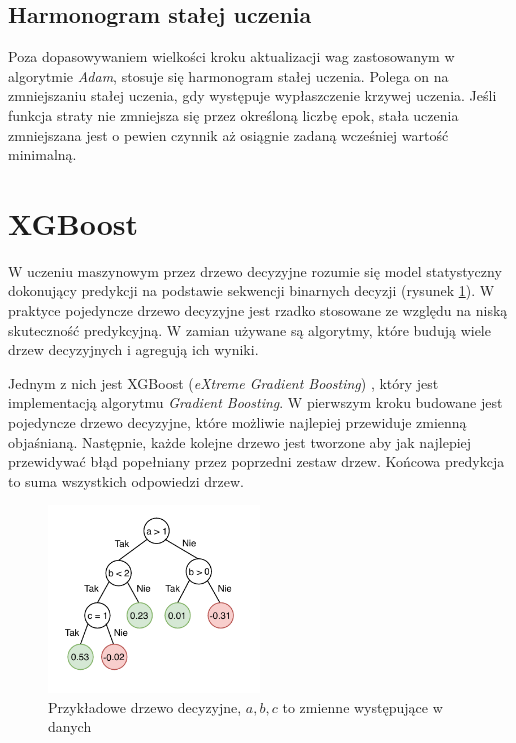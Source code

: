 \documentclass{pracalicmgr}
\begin{document}
	\subsection{Harmonogram stałej uczenia}
	Poza dopasowywaniem wielkości kroku aktualizacji wag zastosowanym w algorytmie \textit{Adam}, stosuje się harmonogram stałej uczenia. Polega on na zmniejszaniu stałej uczenia, gdy występuje wypłaszczenie krzywej uczenia. Jeśli funkcja straty nie zmniejsza się przez określoną liczbę epok, stała uczenia zmniejszana jest o pewien czynnik aż osiągnie zadaną wcześniej wartość minimalną.
	
	\section{XGBoost}
	W uczeniu maszynowym przez drzewo decyzyjne rozumie się model statystyczny dokonujący predykcji na podstawie sekwencji binarnych decyzji (rysunek \ref{fig:tree}). W praktyce pojedyncze drzewo decyzyjne jest rzadko stosowane ze względu na niską skuteczność predykcyjną. W zamian używane są algorytmy, które budują wiele drzew decyzyjnych i agregują ich wyniki.
	
	 Jednym z nich jest XGBoost (\textit{eXtreme Gradient Boosting}) \cite{xgboost}, który jest implementacją algorytmu \textit{Gradient Boosting}. W pierwszym kroku budowane jest pojedyncze drzewo decyzyjne, które możliwie najlepiej przewiduje zmienną objaśnianą. Następnie, każde kolejne drzewo jest tworzone aby jak najlepiej przewidywać błąd popełniany przez poprzedni zestaw drzew. Końcowa predykcja to suma wszystkich odpowiedzi drzew.
	
	\begin{figure}[h]
	\centering
	\includegraphics[width=0.5\textwidth]{tree.pdf}
	\caption{Przykładowe drzewo decyzyjne, $a, b, c$ to zmienne występujące w danych}
	\label{fig:tree}
	\end{figure}
	
\end{document}
